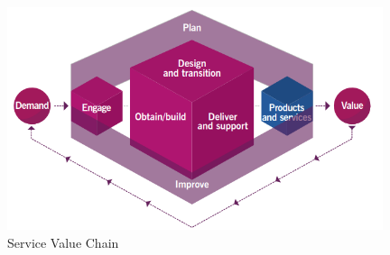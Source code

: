 \documentclass[
  digital,     %
  twoside,     %
  lof,         %
  lot,         %
]{fithesis4}
\begin{document}
\begin{compactitem}
    \begin{figure}[b]
        \begin{center}
            \includegraphics[width=11cm]{img/value_chain.png}
        \end{center}
        \caption{Service Value Chain \parencite[s.~21]{Cartlidge2020}}
        \label{fig:value_chain}
    \end{figure} 
    

\end{compactitem}
\end{document}
